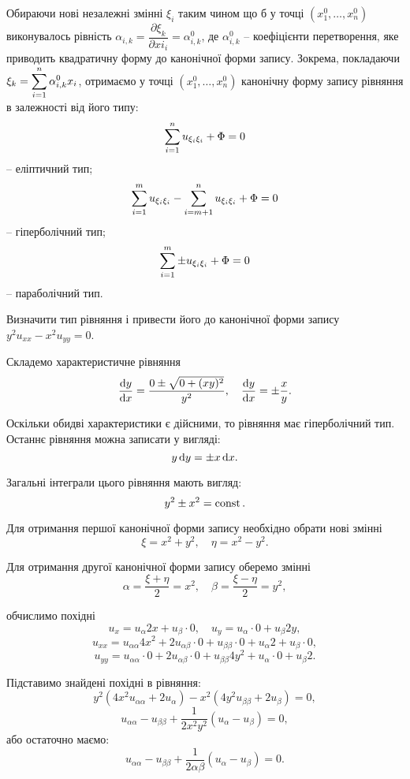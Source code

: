 Обираючи нові незалежні змінні $\xi_i$ таким чином що б у точці $(x_1^0,\ldots,x_n^0)$ виконувалось рівність $\alpha_{i,k}=\dfrac{\partial \xi_k}{\partial xi_i} = \alpha_{i,k}^0$, де $\alpha_{i,k}^0$ -- коефіцієнти перетворення, яке приводить квадратичну форму до канонічної форми запису. Зокрема, покладаючи $\xi_k = \displaystyle\sum\limits_{i=1}^n \alpha_{i,k}^0 x_i$, отримаємо у точці $(x_1^0,\ldots,x_n^0)$ канонічну форму запису рівняння в залежності від його типу:
\begin{equation}
	\label{eq:7.18}
	\displaystyle\sum\limits_{i=1}^n u_{\xi_i\xi_i} + \Phi = 0
\end{equation} -- еліптичний тип;
\begin{equation}
	\label{eq:7.19}
	\displaystyle\sum\limits_{i=1}^m u_{\xi_i\xi_i} - \displaystyle\sum\limits_{i=m+1}^n u_{\xi_i\xi_i} + \Phi = 0
\end{equation} -- гіперболічний тип;
\begin{equation}
	\label{eq7.20}
	\displaystyle\sum\limits_{i=1}^m \pm u_{\xi_i\xi_i} + \Phi = 0
\end{equation} -- параболічний тип.

\begin{example}
	Визначити тип рівняння і привести його до канонічної форми запису $y^2 u_{xx} - x^2 u_{yy} = 0$.
\end{example}

\begin{solution*}
	Складемо характеристичне рівняння \[ \dfrac{\mathop{}\!\mathrm{d} y}{\mathop{}\!\mathrm{d} x} = \dfrac{0\pm\sqrt{0+(xy)^2}}{y^2}, \quad \dfrac{\mathop{}\!\mathrm{d} y}{\mathop{}\!\mathrm{d} x} = \pm\dfrac{x}{y}. \]

	Оскільки обидві характеристики є дійсними, то рівняння має гіперболічний тип. Останнє рівняння можна записати у вигляді: \[y \mathop{}\!\mathrm{d} y = \pm x \mathop{}\!\mathrm{d} x.\]

	Загальні інтеграли цього рівняння мають вигляд: \[y^2 \pm x^2 = \operatorname{const}.\]

	Для отримання першої канонічної форми запису необхідно обрати нові змінні \[\xi = x^2 + y^2,\quad \eta = x^2 - y^2. \]

	Для отримання другої канонічної форми запису оберемо змінні \[ \alpha = \dfrac{\xi + \eta}{2} = x^2, \quad \beta = \dfrac{\xi-\eta}{2} = y^2, \]

	обчислимо похідні 
	\[ u_x = u_\alpha 2 x + u_\beta \cdot 0, \quad u_y = u_\alpha \cdot 0 + u_\beta 2 y, \]
	\[ u_{xx} = u_{\alpha\alpha} 4x^2 + 2 u_{\alpha\beta} \cdot 0 + u_{\beta\beta} \cdot 0 + u_\alpha 2 + u_\beta \cdot 0, \]
	\[ u_{yy} = u_{\alpha\alpha} \cdot 0 + 2 u_{\alpha\beta} \cdot 0 + u_{\beta\beta} 
	4y^2 + u_\alpha \cdot 0 + u_\beta 2. \]

	Підставимо знайдені похідні в рівняння:
	\[ y^2(4x^2u_{\alpha\alpha} + 2u_\alpha) - x^2(4y^2u_{\beta\beta} + 2u_\beta) = 0, \]
	\[ u_{\alpha\alpha} - u_{\beta\beta} + \dfrac{1}{2x^2y^2}(u_\alpha - u_\beta) = 0, \]
	або остаточно маємо:
	\[ u_{\alpha\alpha} - u_{\beta\beta} + \dfrac{1}{2\alpha\beta}(u_\alpha - u_\beta) = 0. \]
\end{solution*}

